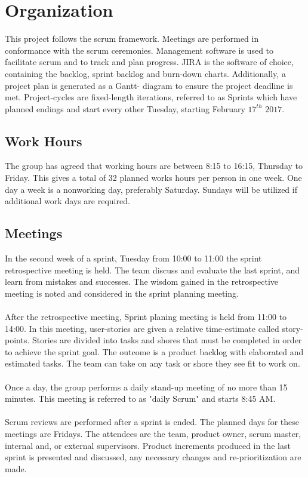 \section{Organization}

This project follows the scrum framework. Meetings are performed in conformance with the scrum ceremonies. Management software is used to facilitate scrum and to track and plan progress. JIRA is the software of choice, containing the backlog, sprint backlog and burn-down charts. Additionally, a project plan is generated as a Gantt- diagram to ensure the project deadline is met. Project-cycles are fixed-length iterations, referred to as Sprints which have planned endings and start every other Tuesday, starting February $17^{th}$ $2017$.


\subsection{Work Hours}

The group has agreed that working hours are between 8:15 to 16:15, Thursday to Friday. This gives a total of 32 planned works hours per person in one week. One day a week is a nonworking day, preferably Saturday. Sundays will be utilized if additional work days are required. 


\subsection{Meetings}
In the second week of a sprint, Tuesday from 10:00 to 11:00 the sprint retrospective meeting is held. The team discuss and evaluate the last sprint, and learn from mistakes and successes. The wisdom gained in the retrospective meeting is noted and considered in the sprint planning meeting.\\
\\
After the retrospective meeting, Sprint planing meeting is held from 11:00 to 14:00. In this meeting, user-stories are   given a relative time-estimate called  story-points. Stories are divided into  tasks and shores that must be completed in order to achieve the sprint goal. The outcome is a product backlog with elaborated and estimated tasks. The team can take on any task or shore they see fit to work on.\\  
\\
Once a day, the group performs a daily stand-up meeting of no more than 15 minutes. This meeting is referred to as "daily Scrum" and starts 8:45 AM. \\
\\
Scrum reviews are performed after a sprint is ended. The planned days for these meetings are Fridays. The attendees are the team, product owner, scrum master, internal and, or external supervisors. Product increments produced in the last sprint is presented and discussed, any necessary changes and re-prioritization are made.
\\\\










